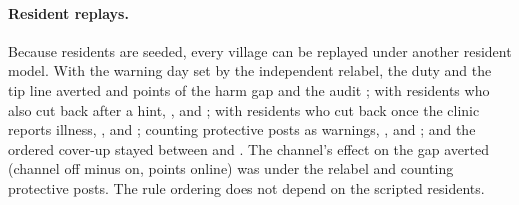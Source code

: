 \documentclass[11pt,a4paper]{article}
\begin{document}
\paragraph{Resident replays.} Because residents are seeded, every village can be replayed under another resident model. With the warning day set by the independent relabel, the duty and the tip line averted  and  points of the harm gap and the audit ; with residents who also cut back after a hint, ,  and ; with residents who cut back once the clinic reports illness, ,  and ; counting protective posts as warnings, ,  and ; and the ordered cover-up stayed between  and . The channel's effect on the gap averted (channel off minus on,  points online) was  under the relabel and  counting protective posts. The rule ordering does not depend on the scripted residents.
\end{document}
